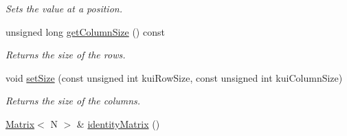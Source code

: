 \begin{DoxyCompactItemize}
\begin{DoxyCompactList}\small\item\em Sets the value at a position. \end{DoxyCompactList}\item 
\hypertarget{class_matrix_a34f1b73377895cf211fd28e8103e9e19}{unsigned long \hyperlink{class_matrix_a34f1b73377895cf211fd28e8103e9e19}{get\+Column\+Size} () const }\label{class_matrix_a34f1b73377895cf211fd28e8103e9e19}

\begin{DoxyCompactList}\small\item\em Returns the size of the rows. \end{DoxyCompactList}\item 
void \hyperlink{class_matrix_a08e8d5924967ddaa167d0f7900d91236}{set\+Size} (const unsigned int kui\+Row\+Size, const unsigned int kui\+Column\+Size)
\begin{DoxyCompactList}\small\item\em Returns the size of the columns. \end{DoxyCompactList}\item 
\hypertarget{class_matrix_a838aaaeed045076e77234cf91d76cf5e}{\hyperlink{class_matrix}{Matrix}$<$ N $>$ \& \hyperlink{class_matrix_a838aaaeed045076e77234cf91d76cf5e}{identity\+Matrix} ()}\label{class_matrix_a838aaaeed045076e77234cf91d76cf5e}


\end{DoxyCompactItemize}
